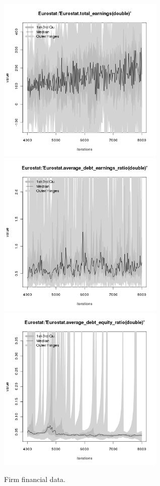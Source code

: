 \begin{figure}[H!]
\begin{minipage}{17cm}
\includegraphics[width=8cm]{./png/tax_0.05/Eurostat-total_earnings.png}\\
\includegraphics[width=8cm]{./png/tax_0.05/Eurostat-average_debt_earnings_ratio.png}
\includegraphics[width=8cm]{./png/tax_0.05/Eurostat-average_debt_equity_ratio.png}
\end{minipage}
\caption{Firm financial data.}
\label{Figure: Firm Financial Data}
\end{figure}


